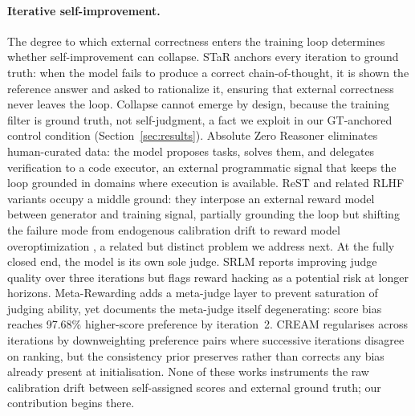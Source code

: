 \documentclass{article}
\begin{document}
\paragraph{Iterative self-improvement.}
The degree to which external correctness enters the training loop
determines whether self-improvement can collapse.
STaR \citep{zelikman2022star} anchors every iteration to ground truth: when the model
fails to produce a correct chain-of-thought, it is shown the reference answer and asked
to rationalize it, ensuring that external correctness never leaves the loop.
Collapse cannot emerge by design, because the training filter is ground truth, not
self-judgment, a fact we exploit in our GT-anchored control condition
(Section~\ref{sec:results}).
Absolute Zero Reasoner \citep{zhao2025azr} eliminates human-curated data: the model
proposes tasks, solves them, and delegates verification to a code executor, an external
programmatic signal that keeps the loop grounded in domains where execution is available.
ReST \citep{gulcehre2023rest} and related RLHF variants occupy a middle ground:
they interpose an external reward model between generator and training signal,
partially grounding the loop but shifting the failure mode from endogenous
calibration drift to reward model overoptimization \citep{gao2023scaling}, a
related but distinct problem we address next.
At the fully closed end, the model is its own sole judge.
SRLM \citep{yuan2024self} reports improving judge quality over three iterations but
flags reward hacking as a potential risk at longer horizons.
Meta-Rewarding \citep{wu2024metarewarding} adds a meta-judge layer to prevent
saturation of judging ability, yet documents the meta-judge itself degenerating:
score bias reaches 97.68\% higher-score preference by iteration~2.
CREAM \citep{cream2025} regularises across iterations by downweighting preference
pairs where successive iterations disagree on ranking, but the consistency prior
preserves rather than corrects any bias already present at initialisation.
None of these works instruments the raw calibration drift between self-assigned
scores and external ground truth; our contribution begins there.
\end{document}
